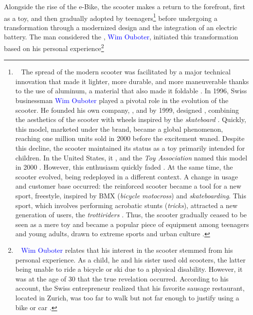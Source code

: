 \begin{refsegment}
Alongside the rise of the \acrshort{e-Bike}, the scooter makes a return to the forefront, first as a toy, and then gradually adopted by teenagers\footnote{~
    The spread of the modern scooter was facilitated by a major technical innovation that made it lighter, more durable, and more maneuverable thanks to the use of aluminum, a material that also made it foldable \textcolor{blue}{\autocite{arte_histoire_2014}}. In 1996, Swiss businessman \textcolor{blue}{Wim Ouboter} played a pivotal role in the evolution of the scooter. He founded his own company, , and by 1999, designed , combining the aesthetics of the scooter with wheels inspired by the \textsl{skateboard} \textcolor{blue}{\autocite{les_numeriques_futur_2015}}. Quickly, this model, marketed under the  brand, became a global phenomenon, reaching one million units sold in 2000 before the excitement waned. Despite this decline, the scooter maintained its status as a toy primarily intended for children. In the United States, it , and the \textsl{Toy Association} named this model  in 2000 \textcolor{blue}{\autocite{bloomberg_citylab_man_2018}}. However, this enthusiasm quickly faded \textcolor{blue}{\autocite[25]{university_of_st_gallen_micro_2011}}. At the same time, the scooter evolved, being redeployed in a different context. A change in usage and customer base occurred: the reinforced scooter became a tool for a new sport, freestyle, inspired by BMX (\textsl{bicycle motocross}) and \textsl{skateboarding}. This sport, which involves performing acrobatic stunts (\textsl{tricks}), attracted a new generation of users, the \textsl{trottiriders} \textcolor{blue}{\autocite{micro-mobility_innovations_2018}}. Thus, the scooter gradually ceased to be seen as a mere toy and became a popular piece of equipment among teenagers and young adults, drawn to extreme sports and urban culture \textcolor{blue}{\autocite{ma_trott_histoire_2020}}.
} before undergoing a transformation through a modernized design and the integration of an electric battery. The man considered the , \textcolor{blue}{Wim Ouboter}, initiated this transformation based on his personal experience\footnote{~
    \textcolor{blue}{Wim Ouboter} relates that his interest in the scooter stemmed from his personal experience. As a child, he and his sister used old scooters, the latter being unable to ride a bicycle or ski due to a physical disability. However, it was at the age of 30 that the true revelation occurred. According to his account, the Swiss entrepreneur realized that his favorite sausage restaurant, located in Zurich, was too far to walk but not far enough to justify using a bike or car \textcolor{blue}{\autocite{ma_trott_histoire_2020}}.
}
\end{refsegment}
